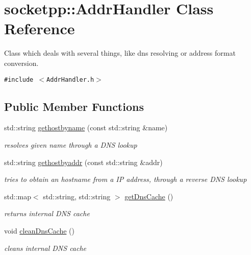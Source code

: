 \hypertarget{classsocketpp_1_1AddrHandler}{
\section{socketpp::AddrHandler Class Reference}
\label{classsocketpp_1_1AddrHandler}
}
Class which deals with several things, like dns resolving or address format conversion.  


{\tt \#include $<$AddrHandler.h$>$}

\subsection*{Public Member Functions}
\begin{CompactItemize}
\item 
std::string \hyperlink{classsocketpp_1_1AddrHandler_19aebc1e9779dee4e5f06d7b39e18959}{gethostbyname} (const std::string \&name)
\begin{CompactList}\small\item\em resolves given name through a DNS lookup \item\end{CompactList}\item 
std::string \hyperlink{classsocketpp_1_1AddrHandler_2e9b9e6dc7ea4fc4a3500665b3f4062d}{gethostbyaddr} (const std::string \&addr)
\begin{CompactList}\small\item\em tries to obtain an hostname from a IP address, through a reverse DNS lookup \item\end{CompactList}\item 
std::map$<$ std::string, std::string $>$ \hyperlink{classsocketpp_1_1AddrHandler_4e10f2291b27d7db2a2860502721f960}{getDnsCache} ()
\begin{CompactList}\small\item\em returns internal DNS cache \item\end{CompactList}\item 
void \hyperlink{classsocketpp_1_1AddrHandler_89a2929af6c042fd7e16661303dfabcb}{cleanDnsCache} ()
\begin{CompactList}\small\item\em cleans internal DNS cache \item\end{CompactList}\end{CompactItemize}
